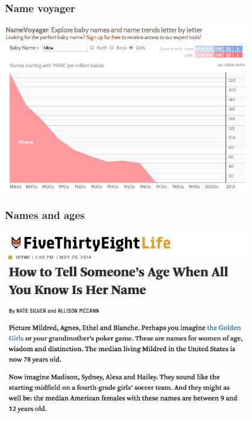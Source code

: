 \documentclass[slidestop,compress,mathserif,12pt,t,professionalfonts,xcolor=table]{beamer}
\begin{document}

\begin{frame}
\frametitle{Name voyager}

\begin{center}
\includegraphics[width=0.8\textwidth]{figures/namevoyager_mine}
\end{center}


\end{frame}


\begin{frame}
\frametitle{Names and ages}

\begin{center}
\includegraphics[width=0.8\textwidth]{figures/nameage538}
\end{center}


\end{frame}
\end{document}
